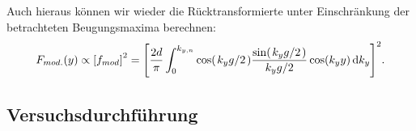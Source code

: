 Auch hieraus können wir wieder die Rücktransformierte unter Einschränkung der betrachteten Beugungsmaxima berechnen:
\begin{align}
  F_{mod.}(y) \propto \qty[f_{mod}]^2 = \qty[\frac{2d}{\pi} \int_0^{k_{y,n}} \cos(\ffrac{k_y g}{2}) \frac{\sin(\ffrac{k_y g}{2})}{\ffrac{k_y g}{2}} \cos(k_y y) \dd{k_y}]^2.
\end{align}

\newpage
\subsection{Versuchsdurchführung}